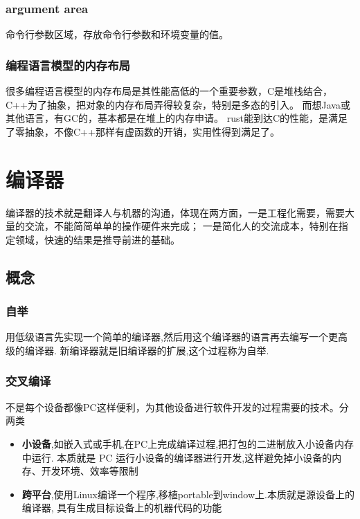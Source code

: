 \subsubsection{argument area}
命令行参数区域，存放命令行参数和环境变量的值。

\subsubsection{编程语言模型的内存布局}
很多编程语言模型的内存布局是其性能高低的一个重要参数，C是堆栈结合，C++为了抽象，把对象的内存布局弄得较复杂，特别是多态的引入。
而想Java或其他语言，有GC的，基本都是在堆上的内存申请。
rust能到达C的性能，是满足了零抽象，不像C++那样有虚函数的开销，实用性得到满足了。

\section{编译器}
编译器的技术就是翻译人与机器的沟通，体现在两方面，一是工程化需要，需要大量的交流，不能简简单单的操作硬件来完成；
一是简化人的交流成本，特别在指定领域，快速的结果是推导前进的基础。

\subsection{概念}

\subsubsection{自举}
用低级语言先实现一个简单的编译器,然后用这个编译器的语言再去编写一个更高级的编译器.
新编译器就是旧编译器的扩展,这个过程称为自举.

\subsubsection{交叉编译}
不是每个设备都像PC这样便利，为其他设备进行软件开发的过程需要的技术。分两类
\begin{itemize}
    \item {\textbf{小设备},如嵌入式或手机,在PC上完成编译过程,把打包的二进制放入小设备内存中运行.
    本质就是 PC 运行小设备的编译器进行开发,这样避免掉小设备的内存、开发环境、效率等限制}
    \item {\textbf{跨平台},使用Linux编译一个程序,移植portable到window上.本质就是源设备上的编译器,
    具有生成目标设备上的机器代码的功能}
\end{itemize}

